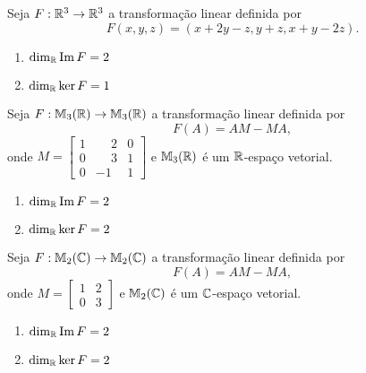 \documentclass[12pt]{exam}
\begin{document}
\begin{exercicio}
    Seja $F : \mathbb{R}^3 \to \mathbb{R}^3$ a transformação linear definida por
    \[
        F(x,y,z) = (x + 2y - z, y + z, x + y - 2z).
    \]
    \begin{solucao}
        \begin{enumerate}[label={\alph*})]
            \item $\dim_{\mathbb{R}}{\rm Im\,} F = 2$

            \item $\dim_{\mathbb{R}}\ker F = 1$
        \end{enumerate}
    \end{solucao}
\end{exercicio}

\begin{exercicio}
    Seja $F : \mathbb{M}_3(\mathbb{R}) \to \mathbb{M}_3(\mathbb{R})$ a transformação linear definida por
    \[
        F(A) = AM - MA,
    \]
    onde $M = \begin{bmatrix}1 & \phantom{-}2 & 0\\0 & \phantom{-}3 & 1\\0 & -1 & 1\end{bmatrix}$ e $\mathbb{M}_3(\mathbb{R})$ é um $\mathbb{R}$-espaço vetorial.
    \begin{solucao}
        \begin{enumerate}[label={\alph*})]
            \item $\dim_{\mathbb{R}}{\rm Im\,} F = 2$

            \item $\dim_{\mathbb{R}}\ker F = 2$
        \end{enumerate}
    \end{solucao}
\end{exercicio}

\begin{exercicio}\label{nucleo_imagem_fim}
    Seja $F : \mathbb{M}_2(\mathbb{C}) \to \mathbb{M}_2(\mathbb{C})$ a transformação linear definida por
    \[
        F(A) = AM - MA,
    \]
    onde $M = \begin{bmatrix}1 & 2\\0 & 3\end{bmatrix}$ e $\mathbb{M}_2(\mathbb{C})$ é um $\mathbb{C}$-espaço vetorial.
    \begin{solucao}
        \begin{enumerate}[label={\alph*})]
            \item $\dim_{\mathbb{R}}{\rm Im\,} F = 2$

        \item $\dim_{\mathbb{R}}\ker F = 2$
        \end{enumerate}
    \end{solucao}
\end{exercicio}
\end{document}
